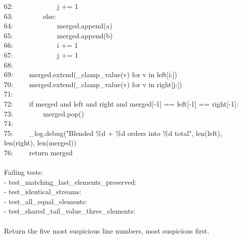 {{{62: ~~~~~~~~~~~~j += 1\\
63: ~~~~~~~~else:\\
64: ~~~~~~~~~~~~merged.append(a)\\
65: ~~~~~~~~~~~~merged.append(b)\\
66: ~~~~~~~~~~~~i += 1\\
67: ~~~~~~~~~~~~j += 1\\
68: \\
69: ~~~~merged.extend(\_clamp\_value(v) for v in left[i:])\\
70: ~~~~merged.extend(\_clamp\_value(v) for v in right[j:])\\
71: \\
72: ~~~~if merged and left and right and merged[-1] == left[-1] == right[-1]:\\
73: ~~~~~~~~merged.pop()\\
74: \\
75: ~~~~\_log.debug("Blended \%d + \%d orders into \%d total", len(left), len(right), len(merged))\\
76: ~~~~return merged\\
~\\
Failing tests:\\
- test\_matching\_last\_elements\_preserved: \\
- test\_identical\_streams: \\
- test\_all\_equal\_elements: \\
- test\_shared\_tail\_value\_three\_elements: \\
~\\
Return the five most suspicious line numbers, most suspicious first.}}

\medskip
{}}
